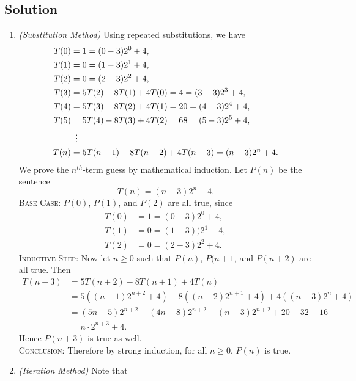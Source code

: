 \documentclass{article}
\begin{document}
\subsection*{Solution}
    \begin{enumerate}
        \item \textit{(Substitution Method)} Using repeated substitutions, we have 
        \begin{align*}
            T(0) &= 1 = (0 - 3)2^{0} + 4, \\
            T(1) &= 0 = (1 - 3)2^{1} + 4, \\
            T(2) &= 0 = (2 - 3)2^{2} + 4, \\
            T(3) &= 5T(2) - 8T(1) + 4T(0) = 4 = (3 - 3)2^{3} + 4, \\
            T(4) &= 5T(3) - 8T(2) + 4T(1) = 20 = (4 - 3)2^{4} + 4, \\
            T(5) &= 5T(4) - 8T(3) + 4T(2) = 68 = (5 - 3)2^{5} + 4, \\
            &\vdotswithin{ = } \\
            T(n) &= 5T(n - 1) - 8T(n - 2) + 4T(n - 3) = (n - 3)2^{n} + 4.
        \end{align*}
        We prove the $n^{th}$-term guess by mathematical induction. Let $P(n)$ be the sentence $$T(n) = (n - 3)2^{n} + 4.$$
        \textsc{Base Case}: $P(0)$, $P(1)$, and $P(2)$ are all true, since
        \begin{align*}
            T(0) &= 1 = (0 - 3)2^{0} + 4, \\
            T(1) &= 0 = (1 - 3))2^{1} + 4, \\
            T(2) &= 0 = (2 - 3)2^{2} + 4.
        \end{align*}
        \textsc{Inductive Step}: Now let $n \ge 0$ such that $P(n)$, $P(n + 1$, and $P(n + 2)$ are all true. Then 
        $$\begin{aligned}
            T(n + 3) &= 5T(n + 2) - 8T(n + 1) + 4T(n) \\
            &= 5((n - 1)2^{n + 2} + 4) - 8((n - 2)2^{n + 1} + 4) + 4((n - 3)2^{n} + 4) \\
            &= (5n - 5)2^{n + 2} - (4n - 8)2^{n + 2} + (n - 3)2^{n + 2} + 20 - 32 + 16 \\
            &= n \cdot 2^{n + 3} + 4.
        \end{aligned}$$
        Hence $P(n + 3)$ is true as well. \\
        \textsc{Conclusion}: Therefore by strong induction, for all $n \ge 0$, $P(n)$ is true.
        \item \textit{(Iteration Method)} Note that 

\end{enumerate}
\end{document}
